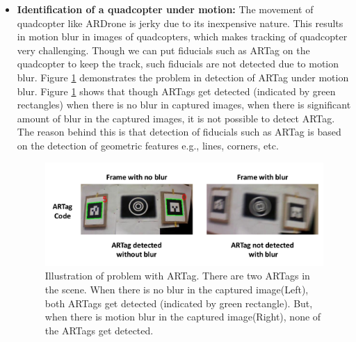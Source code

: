 \begin{itemize}
  \item \textbf{Identification of a quadcopter under motion:}
  The movement of quadcopter like ARDrone is jerky due to its inexpensive
  nature. This results in motion blur in images of quadcopters, which makes
  tracking of quadcopter very challenging. Though we can put fiducials such as
  ARTag on the quadcopter to keep the track, such fiducials are not detected
  due to motion blur. Figure \ref{fig:ARTagBlur} demonstrates the problem in
  detection of ARTag under motion blur. Figure \ref{fig:ARTagBlur} shows
  that though ARTags get detected (indicated by green rectangles) when there
  is no blur in captured images, when there is significant amount of blur in the
  captured images, it is not possible to detect ARTag. The reason behind this is
  that detection of fiducials such as ARTag is based on the detection of
  geometric features e.g., lines, corners, etc.
  
\begin{figure}[h!]
\centering
\includegraphics[width=0.98\linewidth]{figures/fiducial/ARTagBlur}
\caption[Problem of motion blur in ARTag]{Illustration of problem with ARTag.
There are two ARTags in the scene.
When there is no blur in the captured image(Left), both ARTags get detected
(indicated by green rectangle). But, when there is motion blur in the captured
image(Right), none of the ARTags get detected.}
\label{fig:ARTagBlur}
\end{figure}

\end{itemize}

